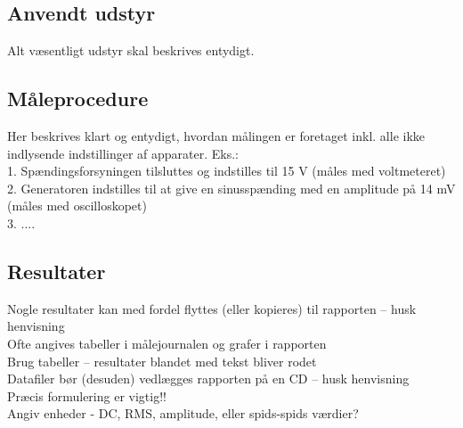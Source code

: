 \subsection*{Anvendt udstyr}
Alt væsentligt udstyr skal beskrives entydigt.\\

\subsection*{Måleprocedure}
Her beskrives klart og entydigt, hvordan målingen er foretaget inkl. alle ikke indlysende indstillinger af apparater. Eks.: \\
1. Spændingsforsyningen tilsluttes og indstilles til 15 V (måles med voltmeteret) \\
2. Generatoren indstilles til at give en sinusspænding med en amplitude på 14 mV (måles med oscilloskopet) \\
3. ....\\

\subsection*{Resultater}
Nogle resultater kan med fordel flyttes (eller kopieres) til rapporten – husk henvisning \\
Ofte angives tabeller i målejournalen og grafer i rapporten \\
Brug tabeller – resultater blandet med tekst bliver rodet\\
Datafiler bør (desuden) vedlægges rapporten på en CD – husk henvisning\\
Præcis formulering er vigtig!!\\
Angiv enheder - DC, RMS, amplitude, eller spids-spids værdier?\\

